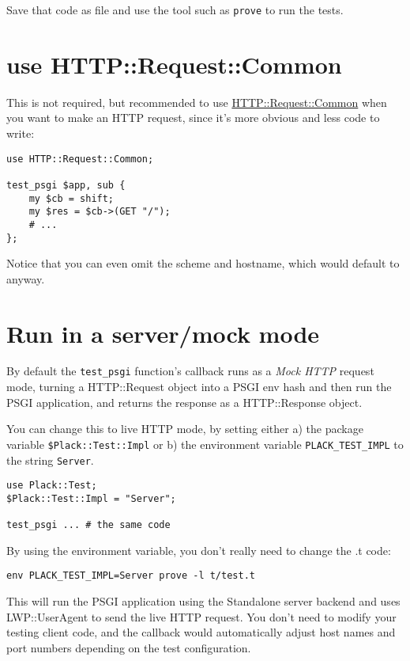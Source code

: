 Save that code as  file and use the tool such as
\lstinline!prove! to run the tests.

\section{use HTTP::Request::Common}\label{use-httprequestcommon}

This is not required, but recommended to use
\href{http://search.cpan.org/perldoc?HTTP::Request::Common}{HTTP::Request::Common}
when you want to make an HTTP request, since it's more obvious and less
code to write:

\begin{lstlisting}
use HTTP::Request::Common;

test_psgi $app, sub {
    my $cb = shift;
    my $res = $cb->(GET "/");
    # ...
};
\end{lstlisting}

Notice that you can even omit the scheme and hostname, which would
default to  anyway.

\section{Run in a server/mock mode}\label{run-in-a-servermock-mode}

By default the \lstinline!test_psgi! function's callback runs as a
\emph{Mock HTTP} request mode, turning a HTTP::Request object into a
PSGI env hash and then run the PSGI application, and returns the
response as a HTTP::Response object.

You can change this to live HTTP mode, by setting either a) the package
variable \lstinline!$Plack::Test::Impl! or b) the environment variable
\lstinline!PLACK_TEST_IMPL! to the string \lstinline!Server!.

\begin{lstlisting}
use Plack::Test;
$Plack::Test::Impl = "Server";

test_psgi ... # the same code
\end{lstlisting}

By using the environment variable, you don't really need to change the
.t code:

\begin{lstlisting}
env PLACK_TEST_IMPL=Server prove -l t/test.t
\end{lstlisting}

This will run the PSGI application using the Standalone server backend
and uses LWP::UserAgent to send the live HTTP request. You don't need to
modify your testing client code, and the callback would automatically
adjust host names and port numbers depending on the test configuration.

